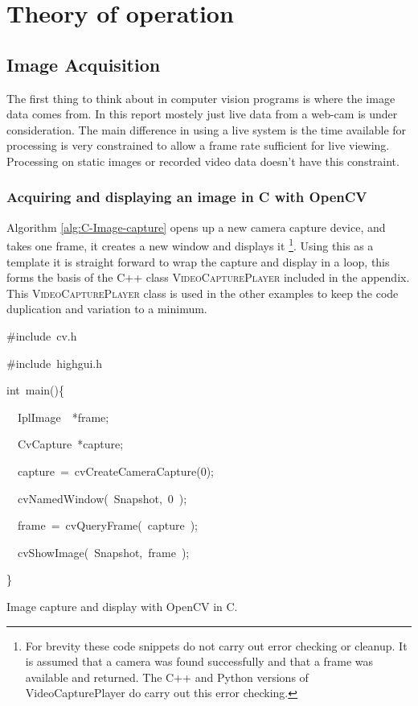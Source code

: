 \documentclass[english]{IEEEtran}
\newcommand{\noun}[1]{\textsc{#1}}
\theoremstyle{plain}
\newenvironment{lyxcode}
{\par\begin{list}{}{
\setlength{\rightmargin}{\leftmargin}
\setlength{\listparindent}{0pt}%
\raggedright
\setlength{\itemsep}{0pt}
\setlength{\parsep}{0pt}
\normalfont\ttfamily}%
 \item[]}
{\end{list}}
\begin{document}
\section{Theory of operation}


\subsection{Image Acquisition}

The first thing to think about in computer vision programs is where
the image data comes from. In this report mostely just live data from
a web-cam is under consideration. The main difference in using a live
system is the time available for processing is very constrained to
allow a frame rate sufficient for live viewing. Processing on static
images or recorded video data doesn't have this constraint.


\subsubsection{Acquiring and displaying an image in C with OpenCV}

Algorithm \ref{alg:C-Image-capture} opens up a new camera capture
device, and takes one frame, it creates a new window and displays
it%
\footnote{For brevity these code snippets do not carry out error checking or
cleanup. It is assumed that a camera was found successfully and that
a frame was available and returned. The C++ and Python versions of
VideoCapturePlayer do carry out this error checking.%
}. Using this as a template it is straight forward to wrap the capture
and display in a loop, this forms the basis of the C++ class \noun{VideoCapturePlayer}
included in the appendix. This \noun{VideoCapturePlayer} class is
used in the other examples to keep the code duplication and variation
to a minimum.

%
\begin{algorithm}[h]
\begin{lyxcode}
\#include~\textquotedbl{}cv.h\textquotedbl{}

\#include~\textquotedbl{}highgui.h\textquotedbl{}

int~main()\{

~~IplImage~~{*}frame;

~~CvCapture~{*}capture;

~~capture~=~cvCreateCameraCapture(0);

~~cvNamedWindow(~\textquotedbl{}Snapshot\textquotedbl{},~0~);

~~frame~=~cvQueryFrame(~capture~);

~~cvShowImage(~\textquotedbl{}Snapshot\textquotedbl{},~frame~);

\}
\end{lyxcode}
\caption{\label{alg:C-Image-capture}Image capture and display with OpenCV
in C. }

\end{algorithm}
\end{document}

